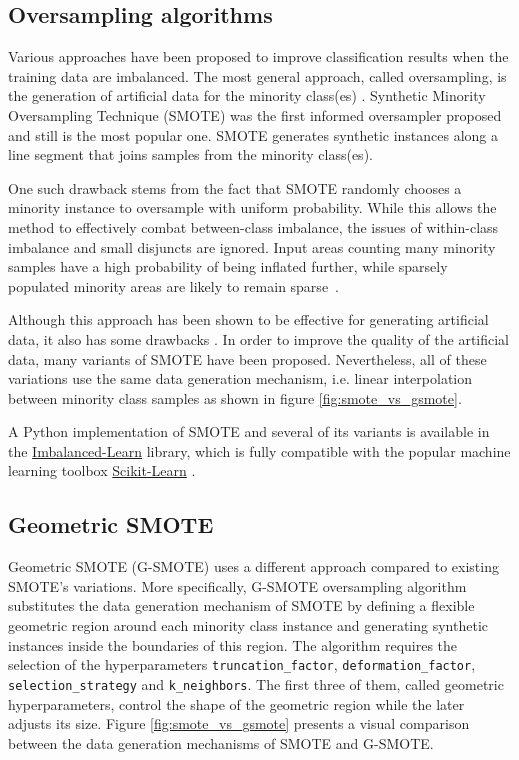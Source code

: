 \documentclass[preprint,12pt, a4paper]{elsarticle}
\begin{document}
\subsection{Oversampling algorithms}
\label{oversampling}

Various approaches have been proposed to improve classification results when the training data are imbalanced. The most general approach, called oversampling, is the generation of artificial data for the minority class(es) \cite{Fernandez2013}. Synthetic Minority Oversampling Technique (SMOTE) \cite{Chawla2002} was the first informed oversampler proposed and still is the most popular one. SMOTE generates synthetic instances along a line segment that joins samples from the minority class(es). 

One such drawback stems from the
fact that SMOTE randomly chooses a minority instance to oversample with
uniform probability. While this allows the method to effectively combat
between-class imbalance, the issues of within-class imbalance and small
disjuncts are ignored. Input areas counting many minority samples have a high
probability of being inflated further, while sparsely populated minority areas
are likely to remain sparse~\citep{Prati.2004}.

Although this approach has been shown to be effective for generating artificial data, it also has some drawbacks \cite{He2009}. In order to improve the quality of the artificial data, many variants of SMOTE have been proposed. Nevertheless, all of these variations use the same data generation mechanism, i.e. linear interpolation between minority class samples as shown in figure \ref{fig:smote_vs_gsmote}.

A Python implementation of SMOTE and several of its variants is available in the \href{https://imbalanced-learn.org/stable/}{Imbalanced-Learn} \cite{Lemaitre2016} library, which is fully compatible with the popular machine learning toolbox \href{https://scikit-learn.org/stable/}{Scikit-Learn} \cite{Pedregosa2011}. 

\subsection{Geometric SMOTE}
\label{gsmote}

Geometric SMOTE (G-SMOTE) \cite{Douzas2019} uses a different approach compared to existing SMOTE's variations. More specifically, G-SMOTE oversampling algorithm substitutes the data generation mechanism of SMOTE by defining a flexible geometric region around each minority class instance and generating synthetic instances inside the boundaries of this region. The algorithm requires the selection of the hyperparameters \texttt{truncation\_factor}, \texttt{deformation\_factor}, \texttt{selection\_strategy} and \texttt{k\_neighbors}. The first three of them, called geometric hyperparameters, control the shape of the geometric region while the later adjusts its size. Figure \ref{fig:smote_vs_gsmote} presents a visual comparison between the data generation mechanisms of SMOTE and G-SMOTE.
\end{document}
